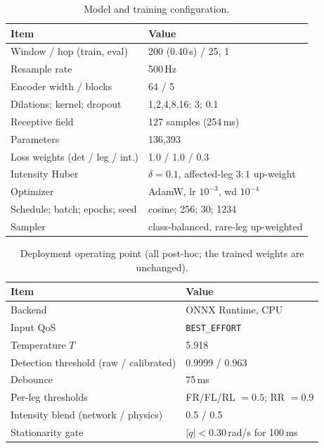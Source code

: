 \begin{table}[t]
\centering
\caption{Model and training configuration.}
\label{tab:hparams}
\footnotesize
\begin{tabular}{@{}ll@{}}
\toprule
Item & Value \\
\midrule
Window / hop (train, eval) & 200 (0.40\,s) / 25, 1 \\
Resample rate & 500\,Hz \\
Encoder width / blocks & 64 / 5 \\
Dilations; kernel; dropout & 1,2,4,8,16; 3; 0.1 \\
Receptive field & 127 samples (254\,ms) \\
Parameters & 136{,}393 \\
Loss weights (det / leg / int.) & 1.0 / 1.0 / 0.3 \\
Intensity Huber & $\delta{=}0.1$, affected-leg $3{:}1$ up-weight \\
Optimizer & AdamW, lr $10^{-3}$, wd $10^{-4}$ \\
Schedule; batch; epochs; seed & cosine; 256; 30; 1234 \\
Sampler & class-balanced, rare-leg up-weighted \\
\bottomrule
\end{tabular}
\end{table}

\begin{table}[t]
\centering
\caption{Deployment operating point (all post-hoc; the trained weights are unchanged).}
\label{tab:oppoint}
\footnotesize
\begin{tabular}{@{}ll@{}}
\toprule
Item & Value \\
\midrule
Backend & ONNX Runtime, CPU \\
Input QoS & \texttt{BEST\_EFFORT} \\
Temperature $T$ & 5.918 \\
Detection threshold (raw / calibrated) & 0.9999 / 0.963 \\
Debounce & 75\,ms \\
Per-leg thresholds & FR/FL/RL $=0.5$; RR $=0.9$ \\
Intensity blend (network / physics) & 0.5 / 0.5 \\
Stationarity gate & $|\dot q|<0.30$\,rad/s for 100\,ms \\
\bottomrule
\end{tabular}
\end{table}

